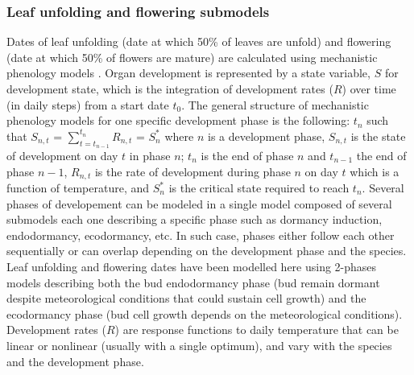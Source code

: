 \documentclass[letterpaper,8pt]{extarticle}  %
\begin{document}
\begin{doublespacing}
\begin{linenumbers}
\subsubsection{Leaf unfolding and flowering submodels}
Dates of leaf unfolding (date at which 50\% of leaves are unfold) and flowering (date at which 50\% of flowers are mature) are calculated using mechanistic phenology models \citep{Chuine2017}. Organ development is represented by a state variable, $S$ for development state, which is the integration of development rates ($R$) over time (in daily steps) from a start date $t_0$. The general structure of mechanistic phenology models for one specific development phase is the following:
$t_n$ such that $S_{n,t}$ = $\sum_{t=t_{n-1}}^{t_n} R_{n,t}$ = $S_n^*$ 
where $n$ is a development phase, $S_{n,t}$ is the state of development on day $t$ in phase $n$; $t_n$ is the end of phase $n$ and  $t_{n-1}$ the end of phase ${n-1}$, $R_{n,t}$ is the rate of development during phase $n$ on day $t$ which is a function of  temperature, and $S_n^*$ is the critical state required to reach $t_n$.  Several phases of developement can be modeled in a single model composed of several submodels each one describing a specific phase such as dormancy induction, endodormancy, ecodormancy, etc. In such case, phases either follow each other sequentially or can overlap depending on the development phase and the species. Leaf unfolding and flowering dates have been modelled here using 2-phases models describing both the bud endodormancy phase (bud remain dormant despite meteorological conditions that could sustain cell growth) and the ecodormancy phase (bud cell growth depends on the meteorological conditions).  Development rates ($R$) are response functions to daily temperature that can be linear or nonlinear (usually with a single optimum), and vary with the species and the development phase. 



\end{linenumbers}
\end{doublespacing}
\end{document}
